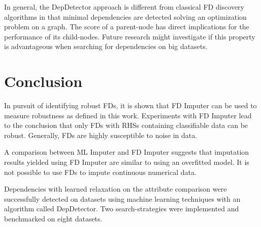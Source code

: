 In general, the DepDetector approach is different from classical FD discovery algorithms in that minimal dependencies are detected solving an optimization problem on a graph.
The score of a parent-node has direct implications for the performance of its child-nodes.
Future research might investigate if this property is advantageous when searching for dependencies on big datasets.

\section{Conclusion}
In pursuit of identifying robust FDs, it is shown that FD Imputer can be used to measure robustness as defined in this work.
Experiments with FD Imputer lead to the conclusion that only FDs with RHSs containing classifiable data can be robust.
Generally, FDs are highly susceptible to noise in data.

A comparison between ML Imputer and FD Imputer suggests that imputation results yielded using FD Imputer are similar to using an overfitted model.
It is not possible to use FDs to impute continuous numerical data.

Dependencies with learned relaxation on the attribute comparison were successfully detected on datasets using machine learning techniques with an algorithm called DepDetector.
Two search-strategies were implemented and benchmarked on eight datasets.
